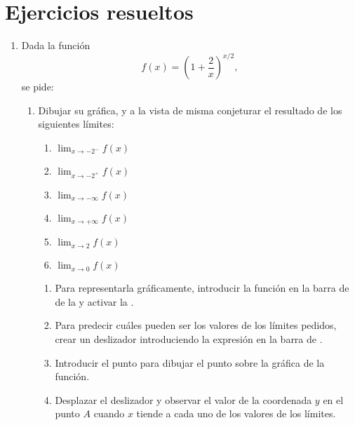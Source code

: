

\section{Ejercicios resueltos}
\begin{enumerate}[leftmargin=*]
\item Dada la función
      \[
      f(x)=\left( 1+\frac{2}{x}\right) ^{x/2},
      \]
      se pide:

      \begin{enumerate}
      \item Dibujar su gráfica, y a la vista de misma conjeturar el resultado de los siguientes límites:
            \begin{multicols}{2}
            \begin{enumerate}
            \item $\lim_{x\rightarrow -2^-} f(x)$
            \item $\lim_{x\rightarrow -2^+} f(x)$
            \item $\lim_{x\rightarrow -\infty} f(x)$
            \item $\lim_{x\rightarrow +\infty} f(x)$
            \item $\lim_{x\rightarrow 2} f(x)$
            \item $\lim_{x\rightarrow 0} f(x)$
            \end{enumerate}
            \end{multicols}

            \begin{indication}
            \begin{enumerate}
            \item Para representarla gráficamente, introducir la función  en la barra de  de la  y activar la .
            \item Para predecir cuáles pueden ser los valores de los límites pedidos, crear un deslizador introduciendo la expresión  en la barra de .
            \item Introducir el punto  para dibujar el punto sobre la gráfica de la función.
            \item Desplazar el deslizador y observar el valor de la coordenada $y$ en el punto $A$ cuando $x$ tiende a cada uno de los valores de los límites.
            \end{enumerate}
            \end{indication}


\end{enumerate}
\end{enumerate}
